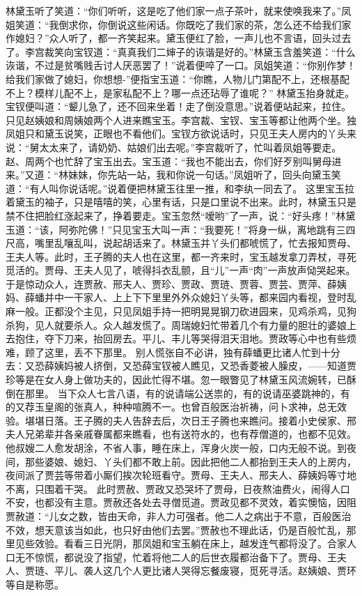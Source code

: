 \documentclass[12pt,oneside]{book}
\begin{document}
林黛玉听了笑道：“你们听听，这是吃了他们家一点子茶叶，就来使唤我来了。”凤姐笑道：“我倒求你，你倒说这些闲话。你既吃了我们家的茶，怎么还不给我们家作媳妇？”众人听了，都一齐笑起来。黛玉便红了脸，一声儿也不言语，回头过去了。李宫裁笑向宝钗道：“真真我们二婶子的诙谐是好的。”林黛玉含羞笑道：“什么诙谐，不过是贫嘴贱舌讨人厌恶罢了！”说着便啐了一口。凤姐笑道：“你别作梦！给我们家做了媳妇，你想想-”便指宝玉道：“你瞧，人物儿门第配不上，还根基配不上？模样儿配不上，是家私配不上？哪一点还玷辱了谁呢？”
林黛玉抬身就走。宝钗便叫道：“颦儿急了，还不回来坐着！走了倒没意思。”说着便站起来，拉住。只见赵姨娘和周姨娘两个人进来瞧宝玉。李宫裁、宝钗、宝玉等都让他两个坐。独凤姐只和黛玉说笑，正眼也不看他们。宝钗方欲说话时，只见王夫人房内的丫头来说：“舅太太来了，请奶奶、姑娘们出去呢。”李宫裁听了，忙叫着凤姐等要走。赵、周两个也忙辞了宝玉出去。宝玉道：“我也不能出去，你们好歹别叫舅母进来。”又道：“林妹妹，你先站一站，我和你说一句话。”凤姐听了，回头向黛玉笑道：“有人叫你说话呢。”说着便把林黛玉往里一推，和李纨一同去了。
这里宝玉拉着黛玉的袖子，只是嘻嘻的笑，心里有话，只是口里说不出来。此时，林黛玉只是禁不住把脸红涨起来了，挣着要走。宝玉忽然“嗳哟”了一声，说：“好头疼！”林黛玉道：“该，阿弥陀佛！”只见宝玉大叫一声：“我要死！”将身一纵，离地跳有三四尺高，嘴里乱嚷乱叫，说起胡话来了。林黛玉并丫头们都唬慌了，忙去报知贾母、王夫人等。此时，王子腾的夫人也在这里，都一齐来时，宝玉越发拿刀弄杖，寻死觅活的。贾母、王夫人见了，唬得抖衣乱颤，且“儿”一声“肉”一声放声恸哭起来。于是惊动众人，连贾赦、邢夫人、贾珍、贾政、贾琏、贾蓉、贾芸、贾萍、薛姨妈、薛蟠并中一干家人、上上下下里里外外众媳妇丫头等，都来园内看视，登时乱麻一般。正都没个主见，只见凤姐手持一把明晃晃钢刀砍进园来，见鸡杀鸡，见狗杀狗，见人就要杀人。众人越发慌了。周瑞媳妇忙带着几个有力量的胆壮的婆娘上去抱住，夺下刀来，抬回房去。平儿、丰儿等哭得泪天泪地。贾政等心中也有些烦难，顾了这里，丢不下那里。
别人慌张自不必讲，独有薛蟠更比诸人忙到十分去：又恐薛姨妈被人挤倒，又恐薛宝钗被人瞧见，又恐香菱被人臊皮，——知道贾珍等是在女人身上做功夫的，因此忙得不堪。忽一眼瞥见了林黛玉风流婉转，已酥倒在那里。
当下众人七言八语，有的说请端公送祟的，有的说请巫婆跳神的，有的又荐玉皇阁的张真人，种种喧腾不一。也曾百般医治祈祷，问卜求神，总无效验。堪堪日落。王子腾的夫人告辞去后，次日王子腾也来瞧问。接着小史侯家、邢夫人兄弟辈并各亲戚眷属都来瞧看，也有送符水的，也有荐僧道的，也都不见效。他叔嫂二人愈发胡涂，不省人事，睡在床上，浑身火炭一般，口内无般不说。到夜间，那些婆娘、媳妇、丫头们都不敢上前。因此把他二人都抬到王夫人的上房内，夜间派了贾芸等带着小厮们挨次轮班看守。贾母、王夫人、邢夫人、薛姨妈等寸地不离，只围着干哭。
此时贾赦、贾政又恐哭坏了贾母，日夜熬油费火，闹得人口不安，也都没有主意。贾赦还各处去寻僧觅道。贾政见都不灵效，着实懊恼，因阻贾赦道：“儿女之数，皆由天命，非人力可强者。他二人之病出于不意，百般医治不效，想天意该当如此，也只好由他们去罢。”贾赦也不理此话，仍是百般忙乱，那里见些效验。看看三日光阴，那凤姐和宝玉躺在床上，越发连气都将没了。合家人口无不惊慌，都说没了指望，忙着将他二人的后世衣履都治备下了。贾母、王夫人、贾琏、平儿、袭人这几个人更比诸人哭得忘餐废寝，觅死寻活。赵姨娘、贾环等自是称愿。
\end{document}
